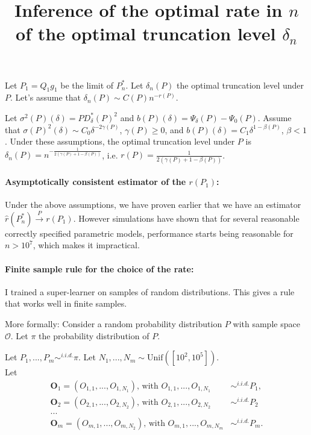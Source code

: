\documentclass[a4paper]{article}
\title{Inference of the optimal rate in $n$ of the optimal truncation level $\delta_n$}
\begin{document}
\maketitle
Let $P_1 = Q_1 g_1$ be the limit of $P^*_n$. Let $\delta_n(P)$ the optimal truncation level under $P$. Let's assume that $\delta_n(P) \sim C(P) n^{-r(P)}$.

Let $\sigma^2(P)(\delta) = P D_\delta^*(P)^2$ and $b(P)(\delta) = \Psi_{\delta}(P) - \Psi_0(P)$. Assume that $\sigma(P)^2(\delta) \sim C_0 \delta^{-2\gamma(P)}$, $\gamma(P) \geq 0$, and $b(P)(\delta) = C_1 \delta^{1 - \beta(P)}$, $\beta < 1$. Under these assumptions, the optimal truncation level under $P$ is $\delta_n(P) = n^{-\frac{1}{2(\gamma(P) + 1 - \beta(P))}}$, i.e. $r(P) = \frac{1}{2(\gamma(P) + 1 - \beta(P))}$.


\paragraph{Asymptotically consistent estimator of the $r(P_1)$:} Under the above assumptions, we have proven earlier that we have an estimator $\hat{r}(P_n^*) \xrightarrow	{P} r(P_1)$. However simulations have shown that for several reasonable correctly specified parametric models, performance starts being reasonable for $n > 10^7$, which makes it impractical.

\paragraph{Finite sample rule for the choice of the rate:} I trained a super-learner on samples of random distributions. This gives a rule that works well in finite samples.

More formally: Consider a random probability distribution $P$ with sample space $\mathcal{O}$. Let $\pi$ the probability distribution of $P$.

Let $P_1,...,P_m \sim^{i.i.d.} \pi$.
Let $N_1,...,N_m \sim \text{Unif}([10^2, 10^5])$.\\

Let
\begin{align*}
\textbf{O}_1 = (O_{1,1},...,O_{1,N_1}) \text{, with } O_{1,1},...,O_{1,N_1} &\sim^{i.i.d.} P_1,\\
\textbf{O}_2 = (O_{2,1},...,O_{2,N_2}) \text{, with } O_{2,1},...,O_{2,N_2} &\sim^{i.i.d.} P_2\\
...\\
\textbf{O}_m = (O_{m,1},...,O_{m,N_2}) \text{, with } O_{m,1},...,O_{m,N_m} &\sim^{i.i.d.} P_m.
\end{align*}
\end{document}
